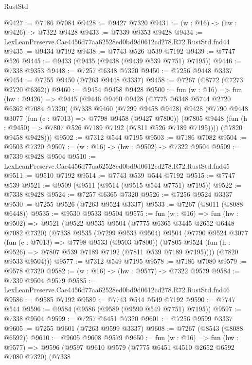 \begin{lexlean}{RustStd}
\begin{coremodule}
@9427 := @7186 @7084
@9428 := @9427 @7320
@9431 := (w : @16) -> (hw : @9426) -> @7322 @9428
@9433 := @7339 @9353 @9428
@9434 := LexLeanPreserve.Cae4456d77aa62528ed0bd9d0612cd278.R72.RustStd.fnd44
@9435 := @9434 @7192
@9438 := @7743 @526 @539 @7192
@9439 := @7747 @526
@9445 := @9433 (@9435 (@9438 (@9439 @539 @7751) @7195))
@9446 := @7338 @9353
@9448 := @7257 @6348 @7320
@9450 := @7256 @9448 @3337
@9454 := @7255 @9450 (@7263 @9448 @3337)
@9458 := @7267 (@8772 (@7273 @2720 @6362))
@9460 := @9454 @9458 @9428
@9500 := fun (w : @16) =>
  fun (hw : @9426) =>
  @9445
    (@9446
      @9460
      @9428
      (@7775 @6348 @5744 @2720 @6362 @7084 @7320)
      (@7338
        @9460
        (@7299 @9458 @9428)
        @9428
        (@7790
          @9448
          @3077
          (fun (c : @7013) => @7798 @9458 (@9427 @7800))
          (@7805 @9448 (fun (h : @9450) => @7807 @526 @7189 @7192 (@7811 @526 @7189 @7195))))
        (@7820 @9458 @9428)))
@9502 := @7312 @544 @7195
@9503 := @7186 @7082
@9504 := @9503 @7320
@9507 := (w : @16) -> (hw : @9502) -> @7322 @9504
@9509 := @7339 @9428 @9504
@9510 := LexLeanPreserve.Cae4456d77aa62528ed0bd9d0612cd278.R72.RustStd.fnd45
@9511 := @9510 @7192
@9514 := @7743 @539 @544 @7192
@9515 := @7747 @539
@9521 := @9509 (@9511 (@9514 (@9515 @544 @7751) @7195))
@9522 := @7338 @9428
@9524 := @7257 @6365 @7320
@9526 := @7256 @9524 @3337
@9530 := @7255 @9526 (@7263 @9524 @3337)
@9533 := @7267 (@8011 (@8088 @6448))
@9535 := @9530 @9533 @9504
@9575 := fun (w : @16) =>
  fun (hw : @9502) =>
  @9521
    (@9522
      @9535
      @9504
      (@7775 @6365 @3445 @2652 @6448 @7082 @7320)
      (@7338
        @9535
        (@7299 @9533 @9504)
        @9504
        (@7790
          @9524
          @3077
          (fun (c : @7013) => @7798 @9533 (@9503 @7800))
          (@7805 @9524 (fun (h : @9526) => @7807 @539 @7189 @7192 (@7811 @539 @7189 @7195))))
        (@7820 @9533 @9504)))
@9577 := @7312 @549 @7195
@9578 := @7186 @7080
@9579 := @9578 @7320
@9582 := (w : @16) -> (hw : @9577) -> @7322 @9579
@9584 := @7339 @9504 @9579
@9585 := LexLeanPreserve.Cae4456d77aa62528ed0bd9d0612cd278.R72.RustStd.fnd46
@9586 := @9585 @7192
@9589 := @7743 @544 @549 @7192
@9590 := @7747 @544
@9596 := @9584 (@9586 (@9589 (@9590 @549 @7751) @7195))
@9597 := @7338 @9504
@9599 := @7257 @6451 @7320
@9601 := @7256 @9599 @3337
@9605 := @7255 @9601 (@7263 @9599 @3337)
@9608 := @7267 (@8543 (@8088 @6592))
@9610 := @9605 @9608 @9579
@9650 := fun (w : @16) =>
  fun (hw : @9577) =>
  @9596
    (@9597
      @9610
      @9579
      (@7775 @6451 @4510 @2652 @6592 @7080 @7320)
      (@7338

\end{coremodule}
\end{lexlean}
